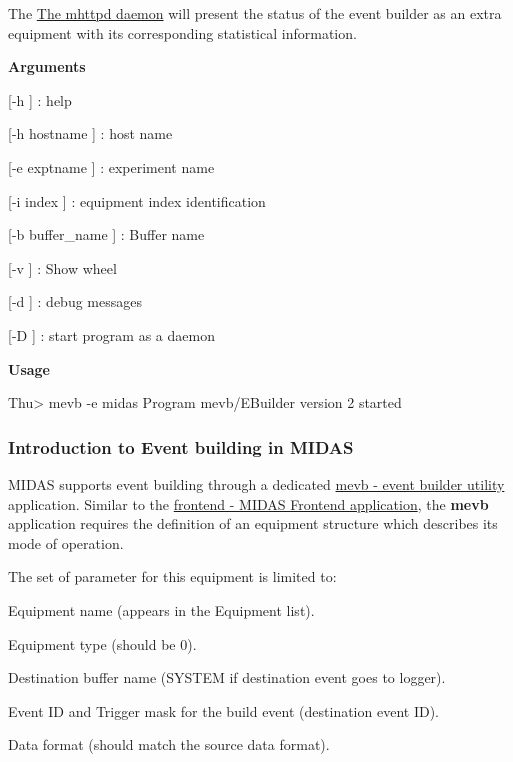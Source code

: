 The \hyperlink{RC_mhttpd_utility}{The mhttpd daemon} will present the status of the event builder as an extra equipment with its corresponding statistical information.


\begin{DoxyItemize}
\item {\bfseries  Arguments }
\begin{DoxyItemize}
\item \mbox{[}-\/h \mbox{]} : help
\item \mbox{[}-\/h hostname \mbox{]} : host name
\item \mbox{[}-\/e exptname \mbox{]} : experiment name
\item \mbox{[}-\/i index \mbox{]} : equipment index identification
\item \mbox{[}-\/b buffer\_\-name \mbox{]} : Buffer name
\item \mbox{[}-\/v \mbox{]} : Show wheel
\item \mbox{[}-\/d \mbox{]} : debug messages
\item \mbox{[}-\/D \mbox{]} : start program as a daemon
\end{DoxyItemize}
\item {\bfseries  Usage } 
\begin{DoxyCode}
  Thu> mevb -e midas
  Program mevb/EBuilder version 2 started
\end{DoxyCode}

\end{DoxyItemize}

\par


\par
 \label{FE_Event_Builder_idx_event_builder}
\hypertarget{FE_Event_Builder_idx_event_builder}{}
\hypertarget{FE_Event_Builder_FE_eb}{}\subsubsection{Introduction to Event building in MIDAS}\label{FE_Event_Builder_FE_eb}
MIDAS supports event building through a dedicated \hyperlink{FE_Event_Builder_FE_mevb_utility}{mevb -\/ event builder utility} application. Similar to the \hyperlink{FrontendOperation_FE_frontend_utility}{frontend -\/ MIDAS Frontend application}, the {\bfseries mevb} application requires the definition of an equipment structure which describes its mode of operation. \par
The set of parameter for this equipment is limited to:
\begin{DoxyItemize}
\item Equipment name (appears in the Equipment list).
\item Equipment type (should be 0).
\item Destination buffer name (SYSTEM if destination event goes to logger).
\item Event ID and Trigger mask for the build event (destination event ID).
\item Data format (should match the source data format).
\end{DoxyItemize}


